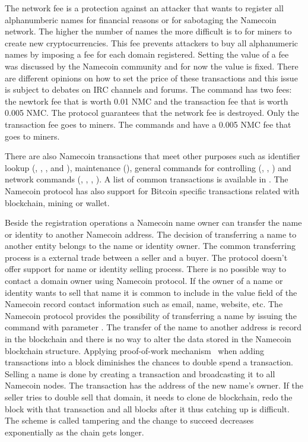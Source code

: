The network fee is a protection against an attacker that wants to register all alphanumberic names for financial reasons or for sabotaging the Namecoin network.
The higher the number of names the more difficult is to for miners to create new cryptocurrencies. This fee prevents attackers to buy all alphanumeric names by imposing a fee for each domain registered.
Setting the value of a fee was discussed by the Namecoin community and for now the value is fixed. There are different opinions on how to set the price of these transactions and this issue is subject to debates on IRC channels and forums.
The command  has two fees: the newtork fee that is worth 0.01 NMC and the transaction fee that is worth 0.005 NMC. The protocol guarantees that the network fee is destroyed. Only the transaction fee goes to miners.
The commands  and  have a 0.005 NMC fee that goes to miners.

There are also Namecoin transactions that meet other purposes such as identifier lookup (, , ,  and ), maintenance (), general commands for controlling
(, , ) and network commands (, , ,
). A list of common transactions is available in .
The Namecoin protocol has also support for Bitcoin specific transactions related with blockchain, mining or wallet.

Beside the registration operations a Namecoin name owner can transfer the name or identity to another Namecoin address.
The decision of transferring a name to another entity belongs to the name or identity owner. The common transferring process is a external trade between a seller and a buyer.
The protocol doesn't offer support for name or identity selling process. There is no possible way to contact a domain owner using Namecoin protocol. If the owner of a name or identity wants to sell that name it is common to include in the value field of the Namecoin record contact information such as email, name, website, etc. The Namecoin protocol provides the possibility of transferring a name by issuing the command  with parameter . The transfer of the name to another address is record in the blockchain and there is no way to alter the data stored in the Namecoin blockchain structure. Applying proof-of-work mechanism~\cite{proofofwork} when adding transactions into a block diminishes the chances to double spend a transaction. Selling a name is done by creating a  transaction and broadcasting it to all Namecoin nodes. The transaction has the address of the new name's owner. If the seller tries to double sell that domain, it needs to clone de blockchain, redo the block with that transaction and all blocks after it thus catching up is difficult. The scheme is called tampering and the change to succeed decreases exponentially as the chain gets longer.


